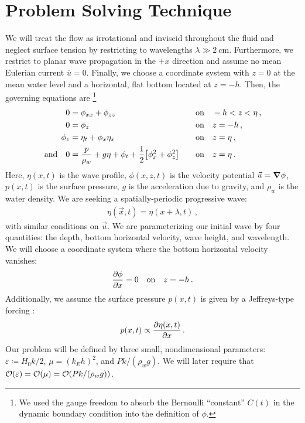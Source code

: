 \documentclass{jfm}
\renewcommand*{\epsilon}{\varepsilon}
\begin{document}
\section{Problem Solving Technique}
We will treat the flow as irrotational and inviscid throughout the
fluid and neglect surface tension by restricting to wavelengths $\lambda
\gg \SI{2}{\centi\meter}$.
Furthermore, we restrict to planar wave propagation in the $+x$
direction and assume no mean Eulerian current $\overline{u} = 0$.
Finally, we choose a coordinate system with $z=0$ at the mean water level and
a horizontal, flat bottom located at $z=-h$.
Then, the governing equations are%
\footnote{
  We used the gauge freedom to absorb the Bernoulli ``constant'' $C(t)$
  in the dynamic boundary condition into the definition of $\phi$.
}
\begin{alignat}{2}
  0 &= \phi_{xx} + \phi_{zz} &&\qq{on}
  -h < z < \eta \,, \label{eq:laplace}\\
  0 &= \phi_{z} &&\qq{on} z=-h \,, \label{eq:bottom_bc}\\
  \phi_{z} &= \eta_{t} + \phi_{x} \eta_{x} &&\qq{on} z = \eta \,,
  \label{eq:kinematic_bc}\\
  \qq*{and} 0 &= \frac{p}{\rho_w} + g\eta + \phi_{t} +
  \frac{1}{2} \bqty{\phi_{x}^2 + \phi_{z}^2} &&\qq{on} z=
  \eta \,. \label{eq:dynamic_bc}
\end{alignat}
Here, $\eta(x,t)$ is the wave profile, $\phi(x,z,t)$ is the velocity
potential $\vec{u} = \grad{\phi}$, $p(x,t)$ is the surface pressure,
$g$ is the acceleration due to gravity, and $\rho_w$ is the water
density.
We are seeking a spatially-periodic progressive wave:
\begin{gather}
  \eta(\vec{x},t) = \eta(x + \lambda, t) \,,
\end{gather}
with similar conditions on $\vec{u}$.
We are parameterizing our initial wave by four quantities: the depth,
bottom horizontal velocity, wave height, and wavelength.
We will choose a coordinate system where the bottom horizontal velocity
vanishes:
\begin{equation}
  \pdv{\phi}{x} = 0 \qq{on} z=-h \,. \label{eq:bot_bc_horz}
\end{equation}
Additionally, we assume the surface pressure $p(x,t)$ is given by a
Jeffreys-type forcing \citep{jeffreys1925formation}:
\begin{equation}
  p(x,t) \propto \pdv{\eta(x,t)}{x} \,.
\end{equation}
Our problem will be defined by three small, nondimensional parameters:
$\epsilon \coloneqq H_0 k/2$, $\mu = (k_E h)^2$, and $P k/(\rho_w g)$.
We will later require that $\order{\epsilon} = \order{\mu} = \order{P
k/(\rho_w g)}$.
\end{document}
